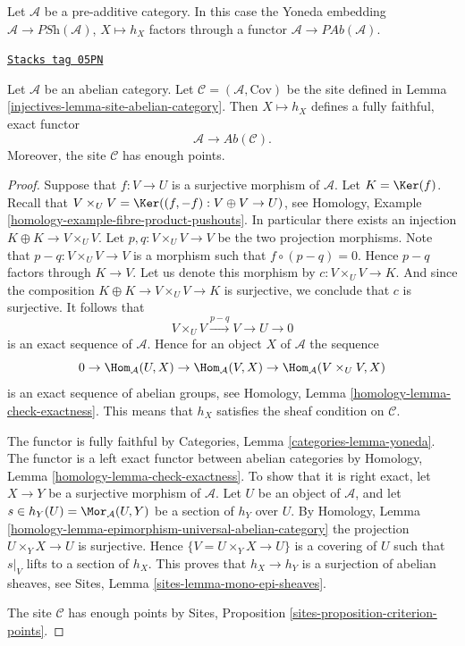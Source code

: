 Let $\mathcal{A}$ be a pre-additive category. In this case the
Yoneda embedding $\mathcal{A} \to \textit{PSh}(\mathcal{A})$, $X \mapsto h_X$
factors through a functor $\mathcal{A} \to \textit{PAb}(\mathcal{A})$.

\begin{lemma}[Embedding]
\label{injectives-lemma-embedding}
\href{https://stacks.math.columbia.edu/tag/05PN}{\texttt{Stacks tag 05PN}}

Let $\mathcal{A}$ be an abelian category.
Let $\mathcal{C} = (\mathcal{A}, \text{Cov})$ be the
site defined in
Lemma \ref{injectives-lemma-site-abelian-category}.
Then $X \mapsto h_X$ defines a fully faithful, exact functor
$$
\mathcal{A} \longrightarrow \textit{Ab}(\mathcal{C}).
$$
Moreover, the site $\mathcal{C}$ has enough points.
\end{lemma}

\begin{proof}
Suppose that $f : V \to U$ is a surjective morphism of $\mathcal{A}$.
Let $K = \Ker(f)$. Recall that
$V \times_U V = \Ker((f, -f) : V \oplus V \to U)$, see
Homology, Example \ref{homology-example-fibre-product-pushouts}.
In particular there exists an injection $K \oplus K \to V \times_U V$.
Let $p, q : V \times_U V \to V$ be the two projection morphisms.
Note that $p - q : V \times_U V \to V$ is a morphism such that
$f \circ (p  - q) = 0$. Hence $p - q$ factors through $K \to V$.
Let us denote this morphism by $c : V \times_U V \to K$.
And since the composition $K \oplus K \to V \times_U V \to K$
is surjective, we conclude that $c$ is surjective. It follows that
$$
V \times_U V \xrightarrow{p - q} V \to U \to 0
$$
is an exact sequence of $\mathcal{A}$.
Hence for an object $X$ of $\mathcal{A}$ the sequence
$$
0 \to
\Hom_\mathcal{A}(U, X) \to
\Hom_\mathcal{A}(V, X) \to
\Hom_\mathcal{A}(V \times_U V, X)
$$
is an exact sequence of abelian groups, see
Homology, Lemma \ref{homology-lemma-check-exactness}.
This means that $h_X$ satisfies the sheaf condition
on $\mathcal{C}$.

\medskip\noindent
The functor is fully faithful by
Categories, Lemma \ref{categories-lemma-yoneda}.
The functor is a left exact functor between abelian categories by
Homology, Lemma \ref{homology-lemma-check-exactness}.
To show that it is right exact, let $X \to Y$ be a surjective morphism
of $\mathcal{A}$. Let $U$ be an object of $\mathcal{A}$, and let
$s \in h_Y(U) = \Mor_\mathcal{A}(U, Y)$ be a section of $h_Y$
over $U$. By
Homology, Lemma \ref{homology-lemma-epimorphism-universal-abelian-category}
the projection $U \times_Y X \to U$ is surjective.
Hence $\{V = U \times_Y X \to U\}$ is a covering of $U$ such that
$s|_V$ lifts to a section of $h_X$. This proves that
$h_X \to h_Y$ is a surjection of abelian sheaves, see
Sites, Lemma \ref{sites-lemma-mono-epi-sheaves}.

\medskip\noindent
The site $\mathcal{C}$ has enough points by
Sites, Proposition \ref{sites-proposition-criterion-points}.
\end{proof}

